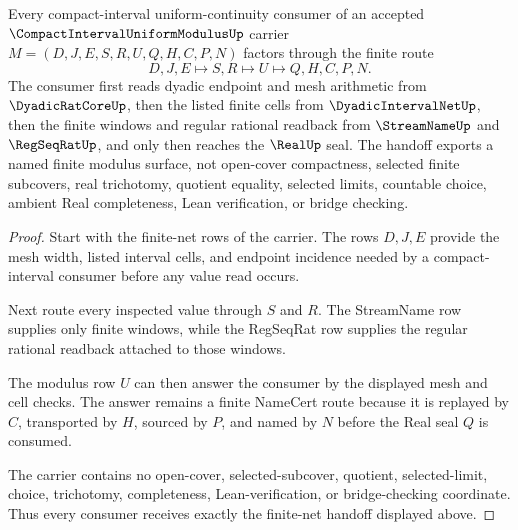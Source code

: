 \begin{theorem}\label{thm:compact-interval-uniform-modulus-finite-net-handoff}
Every compact-interval uniform-continuity consumer of an accepted $\CompactIntervalUniformModulusUp$ carrier $M=(D,J,E,S,R,U,Q,H,C,P,N)$ factors through the finite route
$$
D,J,E \longmapsto S,R \longmapsto U \longmapsto Q,H,C,P,N .
$$
The consumer first reads dyadic endpoint and mesh arithmetic from $\DyadicRatCoreUp$, then the listed finite cells from $\DyadicIntervalNetUp$, then the finite windows and regular rational readback from $\StreamNameUp$ and $\RegSeqRatUp$, and only then reaches the $\RealUp$ seal. The handoff exports a named finite modulus surface, not open-cover compactness, selected finite subcovers, real trichotomy, quotient equality, selected limits, countable choice, ambient Real completeness, Lean verification, or bridge checking.
\end{theorem}
\begin{proof}
Start with the finite-net rows of the carrier. The rows $D,J,E$ provide the mesh width, listed interval cells, and endpoint incidence needed by a compact-interval consumer before any value read occurs.

Next route every inspected value through $S$ and $R$. The StreamName row supplies only finite windows, while the RegSeqRat row supplies the regular rational readback attached to those windows.

The modulus row $U$ can then answer the consumer by the displayed mesh and cell checks. The answer remains a finite NameCert route because it is replayed by $C$, transported by $H$, sourced by $P$, and named by $N$ before the Real seal $Q$ is consumed.

The carrier contains no open-cover, selected-subcover, quotient, selected-limit, choice, trichotomy, completeness, Lean-verification, or bridge-checking coordinate. Thus every consumer receives exactly the finite-net handoff displayed above.
\end{proof}


